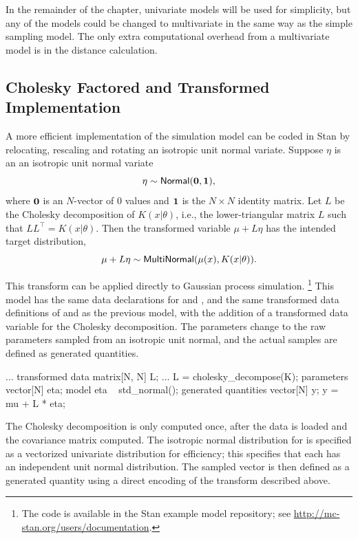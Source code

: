 In the remainder of the chapter, univariate models will be used for simplicity,
but any of the models could be changed to multivariate in the same way as the
simple sampling model. The only extra computational overhead from a
multivariate model is in the distance calculation.

\subsection{Cholesky Factored and Transformed Implementation}

A more efficient implementation of the simulation model can be
coded in Stan by relocating, rescaling and rotating an isotropic unit
normal variate.  Suppose $\eta$ is an an isotropic unit normal variate
\[
\eta \sim \mbox{\sf Normal}({\bf 0}, {\bf 1}),
\]
where ${\bf 0}$ is an $N$-vector of 0 values and ${\bf 1}$ is the $N
\times N$ identity matrix.  Let $L$ be the Cholesky decomposition of
$K(x | \theta)$, i.e., the lower-triangular matrix $L$ such that $LL^{\top} =
K(x | \theta)$.  Then the transformed variable $\mu + L\eta$ has the intended
target distribution,
\[
  \mu + L\eta \sim \mbox{\sf MultiNormal}(\mu(x), K(x | \theta)).
\]

This transform can be applied directly to Gaussian process
simulation.%
%
\footnote{The code is available in the Stan example model repository;
see \url{http://mc-stan.org/users/documentation}.}
%
This model has the same data declarations for  and ,
and the same transformed data definitions of  and
 as the previous model, with the addition of a transformed
data variable for the Cholesky decomposition.  The parameters change
to the raw parameters sampled from an isotropic unit normal, and the
actual samples are defined as generated quantities.
%
\begin{stancode}
...
transformed data {
  matrix[N, N] L;
...
  L = cholesky_decompose(K);
}
parameters {
  vector[N] eta;
}
model {
  eta ~ std_normal();
}
generated quantities {
  vector[N] y;
  y = mu + L * eta;
}
\end{stancode}
%
The Cholesky decomposition is only computed once, after the data is
loaded and the covariance matrix  computed.  The isotropic
normal distribution for  is specified as a vectorized
univariate distribution for efficiency; this specifies that each
 has an independent unit normal distribution.  The sampled
vector  is then defined as a generated quantity using a direct
encoding of the transform described above.

